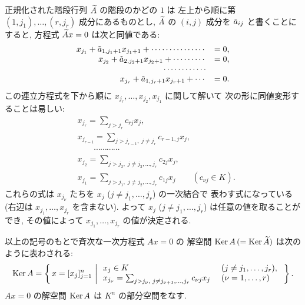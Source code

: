 \documentclass[12pt,twoside]{jarticle}
\begin{document}
正規化された階段行列 ${\widetilde A}$ の階段のかどの $1$ は
左上から順に第 $(1,j_1),\ldots,(r,j_r)$ 成分にあるものとし, ${\widetilde A}$ の $(i,j)$ 
成分を ${\tilde a}_{ij}$ と書くことにすると, 方程式 ${\widetilde A} x=0$ は次と同値である:
\begin{equation*}
  \begin{array}{rl}
    x_{j_1} + {\tilde a}_{1,j_1+1}x_{j_1+1} +\cdots\cdots\cdots\cdots\cdots &= 0,
    \\ 
    x_{j_2} + {\tilde a}_{2,j_2+1}x_{j_2+1} +\cdots\cdots\cdots &= 0,
    \\ 
    \qquad\cdots\cdots\cdots\cdots
    \\ 
    x_{j_r} + {\tilde a}_{1,j_r+1}x_{j_r+1} +\cdots &= 0.
  \end{array}
\end{equation*}
この連立方程式を下から順に $x_{j_r},\ldots,x_{j_2},x_{j_1}$ に関して解いて
次の形に同値変形することは易しい:
\begin{align*}
  &
  x_{j_r} = \sum_{j>j_r} c_{rj} x_j,
  \\ &
  x_{j_{r-1}} = \sum_{j>j_{r-1},\; j\ne j_r} c_{r-1,j} x_j,
  \\ &
  \qquad\cdots\cdots\cdots\cdots
  \\ &
  x_{j_2} = \sum_{j>j_2,\; j\ne j_3,\ldots,j_r} c_{2j} x_j,
  \\ &
  x_{j_1} = \sum_{j>j_1,\; j\ne j_2,\ldots,j_r} c_{1j} x_j
  \qquad (c_{\nu j}\in K).
\end{align*}
これらの式は $x_{j_\nu}$ たちを $x_j$ ($j\ne j_1,\ldots,j_r$) の一次結合で
表わす式になっている (右辺は $x_{j_1},\ldots,x_{j_r}$ を含まない).
よって $x_j$ ($j\ne j_1,\ldots,j_r$) は任意の値を取ることができ,
その値によって $x_{j_1},\ldots,x_{j_r}$ の値が決定される.

以上の記号のもとで斉次な一次方程式 $Ax=0$ の
解空間 $\mathop{\mathrm{Ker}}\nolimits A \,(=\mathop{\mathrm{Ker}}\nolimits{\widetilde A})$ は次のように表わされる:
\begin{equation*}
  \mathop{\mathrm{Ker}}\nolimits A =
  \left\{\,
    x=[x_j]_{j=1}^n
  \,\left|\,
    \begin{array}{ll}
      x_j\in K 
      & \ (j\ne j_1,\ldots,j_r), 
      \\
      x_{j_\nu} = \sum_{j>j_\nu,\; j\ne j_{\nu+1},\ldots,j_r} c_{\nu j} x_j
      & \ (\nu=1,\ldots,r)
    \end{array}
  \right.
  \,\right\}.
\end{equation*}
$Ax=0$ の解空間 $\mathop{\mathrm{Ker}}\nolimits A$ は $K^n$ の部分空間をなす. 
\end{document}
